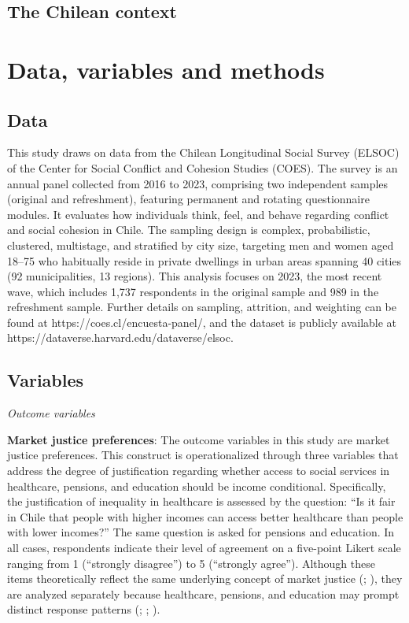 \documentclass[
  12pt,
]{article}
\begin{document}
\subsection{The Chilean context}\label{the-chilean-context}

\section{Data, variables and methods}\label{data-variables-and-methods}

\subsection{Data}\label{data}

This study draws on data from the Chilean Longitudinal Social Survey
(ELSOC) of the Center for Social Conflict and Cohesion Studies (COES).
The survey is an annual panel collected from 2016 to 2023, comprising
two independent samples (original and refreshment), featuring permanent
and rotating questionnaire modules. It evaluates how individuals think,
feel, and behave regarding conflict and social cohesion in Chile. The
sampling design is complex, probabilistic, clustered, multistage, and
stratified by city size, targeting men and women aged 18--75 who
habitually reside in private dwellings in urban areas spanning 40 cities
(92 municipalities, 13 regions). This analysis focuses on 2023, the most
recent wave, which includes 1,737 respondents in the original sample and
989 in the refreshment sample. Further details on sampling, attrition,
and weighting can be found at https://coes.cl/encuesta-panel/, and the
dataset is publicly available at
https://dataverse.harvard.edu/dataverse/elsoc.

\subsection{Variables}\label{variables}

\emph{Outcome variables}

\textbf{Market justice preferences}: The outcome variables in this study
are market justice preferences. This construct is operationalized
through three variables that address the degree of justification
regarding whether access to social services in healthcare, pensions, and
education should be income conditional. Specifically, the justification
of inequality in healthcare is assessed by the question: ``Is it fair in
Chile that people with higher incomes can access better healthcare than
people with lower incomes?'' The same question is asked for pensions and
education. In all cases, respondents indicate their level of agreement
on a five-point Likert scale ranging from 1 (``strongly disagree'') to 5
(``strongly agree''). Although these items theoretically reflect the
same underlying concept of market justice
(;
), they are analyzed
separately because healthcare, pensions, and education may prompt
distinct response patterns
(;
;
).
\end{document}
